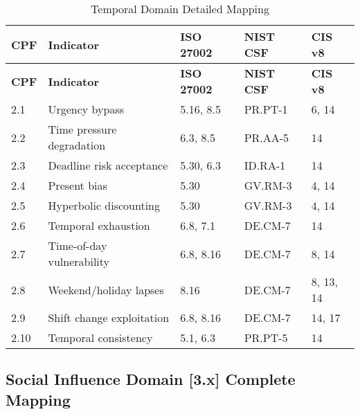 \documentclass[11pt,a4paper]{article}
\begin{document}
\begin{longtable}{p{1cm}p{4cm}p{2.5cm}p{2.5cm}p{2cm}}
\caption{Temporal Domain Detailed Mapping} \\
\toprule
\textbf{CPF} & \textbf{Indicator} & \textbf{ISO 27002} & \textbf{NIST CSF} & \textbf{CIS v8} \\
\midrule
\endfirsthead
\toprule
\textbf{CPF} & \textbf{Indicator} & \textbf{ISO 27002} & \textbf{NIST CSF} & \textbf{CIS v8} \\
\midrule
\endhead
\bottomrule
\endlastfoot

2.1 & Urgency bypass & 5.16, 8.5 & PR.PT-1 & 6, 14 \\
2.2 & Time pressure degradation & 6.3, 8.5 & PR.AA-5 & 14 \\
2.3 & Deadline risk acceptance & 5.30, 6.3 & ID.RA-1 & 14 \\
2.4 & Present bias & 5.30 & GV.RM-3 & 4, 14 \\
2.5 & Hyperbolic discounting & 5.30 & GV.RM-3 & 4, 14 \\
2.6 & Temporal exhaustion & 6.8, 7.1 & DE.CM-7 & 14 \\
2.7 & Time-of-day vulnerability & 6.8, 8.16 & DE.CM-7 & 8, 14 \\
2.8 & Weekend/holiday lapses & 8.16 & DE.CM-7 & 8, 13, 14 \\
2.9 & Shift change exploitation & 6.8, 8.16 & DE.CM-7 & 14, 17 \\
2.10 & Temporal consistency & 5.1, 6.3 & PR.PT-5 & 14 \\

\end{longtable}

\subsection{Social Influence Domain [3.x] Complete Mapping}
\end{document}

